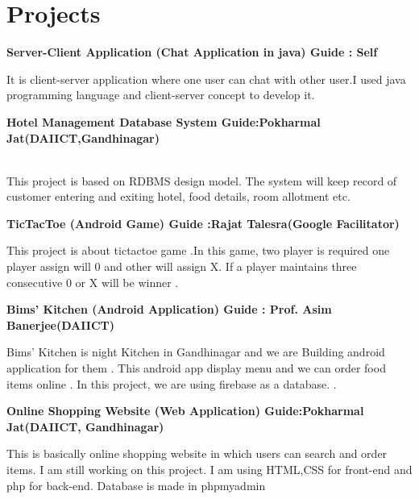 \documentclass{article}
\begin{document}
\section{Projects}


\begin{large}\textbf{Server-Client Application (Chat Application in java) \hspace*{3cm} Guide  : Self } \\
\end{large}
It is client-server application where one user can chat with other user.I used java programming language and client-server concept to develop it.

\begin{large}
\textbf{Hotel Management Database System \hspace*{3cm} Guide:Pokharmal      Jat(DAIICT,Gandhinagar) }
\end{large} \\
This project is based on RDBMS design model. The system
will keep record of customer entering and exiting hotel, food details, room allotment etc.

\begin{large}\textbf{TicTacToe (Android Game) \hspace*{3cm} Guide  :Rajat Talesra(Google Facilitator)}
\end{large}
This project is about tictactoe game .In this game, two player is required one player assign will 0  and other will assign X. If a player maintains three consecutive 0 or X will be winner  .\hspace*{5.5cm}


\begin{large}\textbf{Bims' Kitchen (Android Application)\hspace{3cm} Guide : Prof. Asim Banerjee(DAIICT)}\end{large} 
Bims' Kitchen is night Kitchen in Gandhinagar and we are Building android application for them . This android app display menu and we can order food items online . In this project, we are using firebase as a database.
.\hspace{13cm}  

\begin{large}\textbf{Online Shopping Website (Web Application) \hspace*{3cm}Guide:Pokharmal      Jat(DAIICT, Gandhinagar)}
\end{large}
This is basically online shopping website in which users can search and order items. I am still working on this project.
I am using HTML,CSS for front-end and php for back-end. Database is made in phpmyadmin\hspace*{5.5cm}
\end{document}

